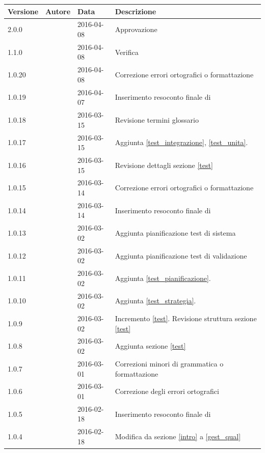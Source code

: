 \documentclass[12pt,a4paper]{article}
\begin{document}
	\begin{center}
		\begin{longtable}[H]{p{} p{} p{} p{}}
			\toprule
			\textbf{Versione}	&	\textbf{Autore}	&	\textbf{Data}	&	\textbf{Descrizione}\\*
			\midrule
			\midrule
			2.0.0 & \TP & 2016-04-08 & Approvazione\\*
			\midrule
			1.1.0 & \AVE & 2016-04-08 & Verifica\\*
			\midrule
			1.0.20 & \TP & 2016-04-08 & Correzione errori ortografici o formattazione \\*
			\midrule
			1.0.19 & \TP & 2016-04-07 & Inserimento resoconto finale di \FPD \\*
			\midrule
			1.0.18 & \TP & 2016-03-15 & Revisione termini glossario \\*
			\midrule
			1.0.17 & \TP & 2016-03-15 & Aggiunta \ref{test_integrazione}, \ref{test_unita}.\\*
			\midrule
			1.0.16 & \TP & 2016-03-15 & Revisione dettagli sezione \ref{test}\\*
			\midrule
			1.0.15 & \AB & 2016-03-14 & Correzione errori ortografici o formattazione \\*
			\midrule
			1.0.14 & \AB & 2016-03-14 & Inserimento resoconto finale di \FPA \\*
			\midrule
			1.0.13 & \AB & 2016-03-02 & Aggiunta pianificazione test di sistema\\*
			\midrule
			1.0.12 & \AB & 2016-03-02 & Aggiunta pianificazione test di validazione\\*
			\midrule
			1.0.11 & \AB & 2016-03-02 & Aggiunta \ref{test_pianificazione}.\\*
			\midrule
			1.0.10 & \AB & 2016-03-02 & Aggiunta \ref{test_strategia}.\\*
			\midrule
			1.0.9 & \AB & 2016-03-02 & Incremento \ref{test}. Revisione struttura sezione \ref{test} \\*
			\midrule
			1.0.8 & \AB & 2016-03-02 & Aggiunta sezione \ref{test} \\*
			\midrule
			1.0.7 & \AB{} & 2016-03-01 & Correzioni minori di grammatica o formattazione \\*
			\midrule
			1.0.6 & \AB{} & 2016-03-01 & Correzione degli errori ortografici   \\*
			\midrule
			1.0.5 & \AB & 2016-02-18 &  Inserimento resoconto finale di \FAD \\*
			\midrule
			1.0.4 & \AB{} & 2016-02-18 & Modifica da  sezione \ref{intro} a \ref{gest_qual} \\*

\end{longtable}
\end{center}
\end{document}
